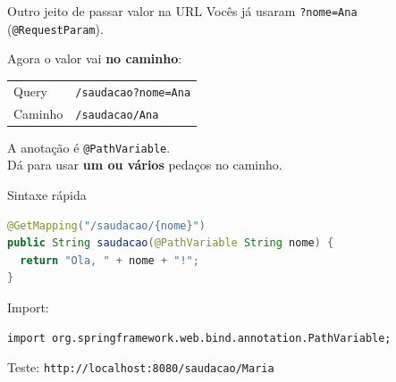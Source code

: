 \documentclass[aspectratio=169,11pt]{beamer}
\begin{document}
\begin{frame}{Outro jeito de passar valor na URL}
  Vocês já usaram \texttt{?nome=Ana} (\texttt{@RequestParam}).

  \vspace{0.5em}
  Agora o valor vai \textbf{no caminho}:

  \begin{center}
  \begin{tabular}{ll}
    \toprule
    Query & \texttt{/saudacao?nome=Ana} \\
    Caminho & \texttt{/saudacao/Ana} \\
    \bottomrule
  \end{tabular}
  \end{center}

  \vspace{0.6em}
  A anotação é \texttt{@PathVariable}.\\
  Dá para usar \textbf{um ou vários} pedaços no caminho.
\end{frame}

\begin{frame}[fragile]{Sintaxe rápida}
\begin{lstlisting}[language=Java,basicstyle=\ttfamily\footnotesize]
@GetMapping("/saudacao/{nome}")
public String saudacao(@PathVariable String nome) {
  return "Ola, " + nome + "!";
}
\end{lstlisting}

  \vspace{0.3em}
  Import:

\begin{lstlisting}[basicstyle=\ttfamily\footnotesize]
import org.springframework.web.bind.annotation.PathVariable;
\end{lstlisting}

  \vspace{0.3em}
  Teste: \texttt{http://localhost:8080/saudacao/Maria}
\end{frame}
\end{document}

